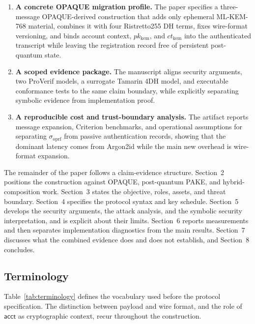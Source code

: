 \documentclass{ieeeijc}
\newcommand{\acct}{\mathsf{acct}}
\newcommand{\sigoprf}{\sigma_{\mathrm{oprf}}}
\theoremstyle{remark}
\begin{document}
\begin{enumerate}
  \item \textbf{A concrete OPAQUE migration profile.} The paper specifies a
        three-message OPAQUE-derived construction that adds only ephemeral
        ML-KEM-768 material, combines it with four Ristretto255 DH terms,
        fixes wire-format versioning, and binds account context,
        $pk_{\mathrm{kem}}$, and $ct_{\mathrm{kem}}$ into the
        authenticated transcript while leaving the registration record free
        of persistent post-quantum state.
  \item \textbf{A scoped evidence package.} The manuscript aligns security
        arguments, two ProVerif models, a surrogate Tamarin 4DH model, and
        executable conformance tests to the same claim boundary, while
        explicitly separating symbolic evidence from implementation proof.
  \item \textbf{A reproducible cost and trust-boundary analysis.} The artifact
        reports message expansion, Criterion benchmarks, and operational
        assumptions for separating $\sigoprf$ from passive authentication
        records, showing that the dominant latency comes from Argon2id while
        the main new overhead is wire-format expansion.
\end{enumerate}

The remainder of the paper follows a claim-evidence structure.
Section~2 positions the construction against OPAQUE, post-quantum PAKE,
and hybrid-composition work. Section~3 states the objective, roles, assets,
and threat boundary. Section~4 specifies the protocol syntax and key
schedule. Section~5 develops the security arguments, the attack analysis, and the
symbolic security interpretation, and is explicit about their limits.
Section~6 reports measurements and then separates implementation
diagnostics from the main results. Section~7 discusses what the combined
evidence does and does not establish, and Section~8 concludes.

\subsection{Terminology}

Table~\ref{tab:terminology} defines the vocabulary used before the protocol
specification. The distinction between payload and wire format, and the role of
$\acct$ as cryptographic context, recur throughout the construction.
\end{document}
